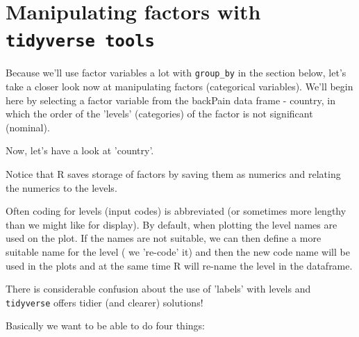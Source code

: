 \documentclass[titlepage]{book}\usepackage{knitr}
\begin{document}
\section{Manipulating factors with \texttt{tidyverse tools}}


Because we'll use factor variables a lot with \texttt{group\_by} in the section below, let's take a closer look now at manipulating factors (categorical variables).
We'll begin here by selecting a factor variable from the backPain data frame - country, in which the order of the 'levels' (categories) of  the factor is not significant (nominal). 

Now, let's have a look at 'country'.
\begin{knitrout}
\color{fgcolor}\begin{kframe}
\begin{alltt}
  \hlcom{# }
\hlopt{$}       
\hlstd{(}        
\hlstd{(} \hlstd{)}  
\hlcom{#----------------------------------------------------------------------------------    }
\end{alltt}
\end{kframe}
\end{knitrout}
  Notice that R saves storage of factors by saving them as numerics and relating the numerics to the levels. 
  
  Often coding for levels (input codes) is abbreviated (or sometimes more lengthy than we might like for display).  By default, when plotting the level names are used on the plot.  If the names are not suitable, we can then define a more suitable name for the level ( we 're-code' it) and then the new code name will be used in the plots and at the same time R will re-name the level in the dataframe. 
  
There is considerable confusion about the use of 'labels' with levels and \texttt{tidyverse} offers  tidier (and clearer) solutions!

Basically we want to be able to do four things:
\end{document}
